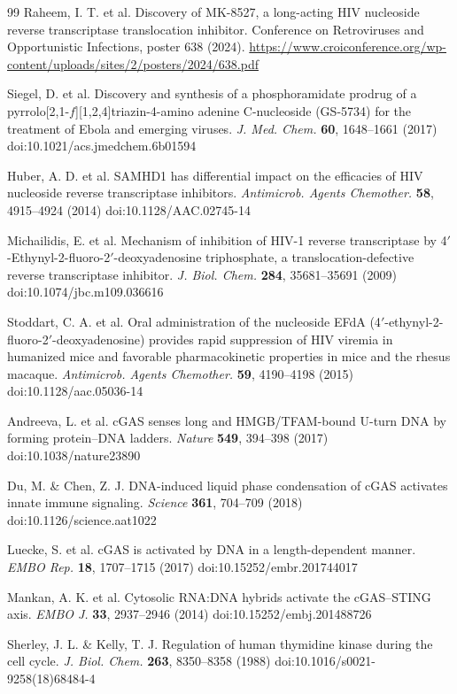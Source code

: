 \documentclass[11pt,twocolumn,twoside]{extarticle}
\begin{document}
\begin{thebibliography}{99}
 Raheem, I. T. et al. Discovery of MK-8527, a long-acting HIV nucleoside reverse transcriptase translocation inhibitor. Conference on Retroviruses and Opportunistic Infections, poster 638 (2024). \url{https://www.croiconference.org/wp-content/uploads/sites/2/posters/2024/638.pdf}

 Siegel, D. et al. Discovery and synthesis of a phosphoramidate prodrug of a pyrrolo[2,1-$f$][1,2,4]triazin-4-amino adenine C-nucleoside (GS-5734) for the treatment of Ebola and emerging viruses. \textit{J. Med. Chem.} \textbf{60}, 1648--1661 (2017) doi:10.1021/acs.jmedchem.6b01594

 Huber, A. D. et al. SAMHD1 has differential impact on the efficacies of HIV nucleoside reverse transcriptase inhibitors. \textit{Antimicrob. Agents Chemother.} \textbf{58}, 4915--4924 (2014) doi:10.1128/AAC.02745-14

 Michailidis, E. et al. Mechanism of inhibition of HIV-1 reverse transcriptase by 4$'$-Ethynyl-2-fluoro-2$'$-deoxyadenosine triphosphate, a translocation-defective reverse transcriptase inhibitor. \textit{J. Biol. Chem.} \textbf{284}, 35681--35691 (2009) doi:10.1074/jbc.m109.036616

 Stoddart, C. A. et al. Oral administration of the nucleoside EFdA (4$'$-ethynyl-2-fluoro-2$'$-deoxyadenosine) provides rapid suppression of HIV viremia in humanized mice and favorable pharmacokinetic properties in mice and the rhesus macaque. \textit{Antimicrob. Agents Chemother.} \textbf{59}, 4190--4198 (2015) doi:10.1128/aac.05036-14

 Andreeva, L. et al. cGAS senses long and HMGB/TFAM-bound U-turn DNA by forming protein--DNA ladders. \textit{Nature} \textbf{549}, 394--398 (2017) doi:10.1038/nature23890

 Du, M. \& Chen, Z. J. DNA-induced liquid phase condensation of cGAS activates innate immune signaling. \textit{Science} \textbf{361}, 704--709 (2018) doi:10.1126/science.aat1022

 Luecke, S. et al. cGAS is activated by DNA in a length-dependent manner. \textit{EMBO Rep.} \textbf{18}, 1707--1715 (2017) doi:10.15252/embr.201744017

 Mankan, A. K. et al. Cytosolic RNA:DNA hybrids activate the cGAS--STING axis. \textit{EMBO J.} \textbf{33}, 2937--2946 (2014) doi:10.15252/embj.201488726

 Sherley, J. L. \& Kelly, T. J. Regulation of human thymidine kinase during the cell cycle. \textit{J. Biol. Chem.} \textbf{263}, 8350--8358 (1988) doi:10.1016/s0021-9258(18)68484-4


\end{thebibliography}
\end{document}
